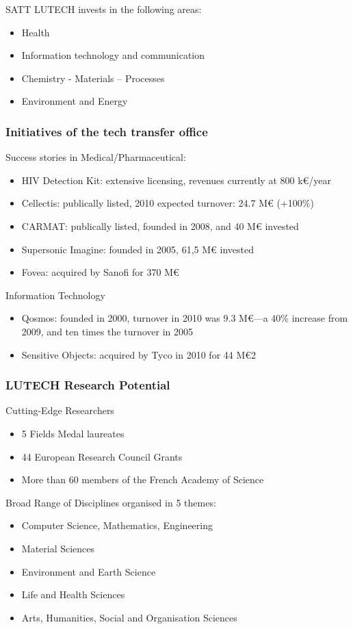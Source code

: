\documentclass[12pt,a4paper,twoside]{article}
\begin{document}
SATT LUTECH invests in the following areas:
\begin{itemize}
\item Health
\item Information technology and communication
\item Chemistry - Materials – Processes
\item Environment and Energy
\end{itemize} 

\subsubsection{Initiatives of the tech transfer office}
Success stories in Medical/Pharmaceutical:
\begin{itemize}
\item HIV Detection Kit: extensive licensing, revenues currently at 800 k€/year
\item Cellectis: publically listed, 2010 expected turnover: 24.7 M€ (+100\%)
\item CARMAT: publically listed, founded in 2008, and 40 M€ invested
\item Supersonic Imagine: founded in 2005, 61,5 M€ invested
\item Fovea: acquired by Sanofi for 370 M€
\end{itemize}
Information Technology
\begin{itemize}
\item Qosmos: founded in 2000, turnover in 2010 was 9.3 M€—a 40\% increase from 2009, and ten times the turnover in 2005
\item Sensitive Objects: acquired by Tyco in 2010 for 44 M€2
\end{itemize}
 
\subsubsection{LUTECH Research Potential}
Cutting-Edge Researchers
\begin{itemize}
\item 5 Fields Medal laureates
\item 44 European Research Council Grants
\item More than 60 members of the French Academy of Science
\end{itemize}
Broad Range of Disciplines organised in 5 themes:
\begin{itemize}
\item Computer Science, Mathematics, Engineering
\item Material Sciences
\item Environment and Earth Science
\item Life and Health Sciences
\item Arts, Humanities, Social and Organisation Sciences
\end{itemize}
 
\end{document}
